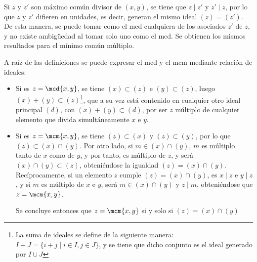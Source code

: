 \begin{TFGampliado}
    \begin{obs}
    \item Si $z$ y $z'$ son máximo común divisor de $(x,y)$, se tiene que $z\mid z'$ y $z'\mid z$, por lo que $z$ y $z'$ difieren en unidades, es decir, generan el mismo ideal $(z) = (z')$. De esta manera, se puede tomar como el mcd cualquiera de los asociados $z'$ de $z$, y no existe ambigüedad al tomar solo uno como el mcd. Se obtienen los mismos resultados para el mínimo común múltiplo.
    
    \item A raíz de las definiciones se puede expresar el mcd y el mcm mediante relación de ideales: 
    \begin{itemize}
        \item Si es $z = \mcd{x,y}$, se tiene $(x) \subset (z)$ e $(y) \subset (z)$, luego $(x) + (y) \subset (z)$\footnote{La suma de ideales se define de la siguiente manera: $I + J = \{i + j \mid i\in I, j \in J\}$, y se tiene que dicho conjunto es el ideal generado por $I \cup J$}, que a su vez está contenido en cualquier otro ideal principal $(d)$, con $(x) + (y) \subset (d)$, por ser $z$ múltiplo de cualquier elemento que divida simultáneamente $x$ e $y$.

        \item Si es $z = \mcm{x,y}$, se tiene $(z) \subset (x)$ y $(z) \subset (y)$, por lo que $(z) \subset (x) \cap (y)$. Por otro lado, si $m \in (x) \cap (y)$, $m$ es múltiplo tanto de $x$ como de $y$, y por tanto, es múltiplo de $z$, y será $(x) \cap (y) \subset(z)$, obteniéndose la igualdad $(z) = (x) \cap (y)$.
        Recíprocamente, si un elemento $z$ cumple $(z) = (x) \cap (y)$, es $x\mid z$ e $y\mid z$, y si $m$ es múltiplo de $x$ e $y$, será $m \in (x) \cap (y)$ y $z\mid m$, obteniéndose que $z = \mcm{x,y}$.

        Se concluye entonces que $z = \mcm{x,y}$ si y solo si $(z) = (x) \cap (y)$
    \end{itemize}
\end{obs}
\end{TFGampliado}




